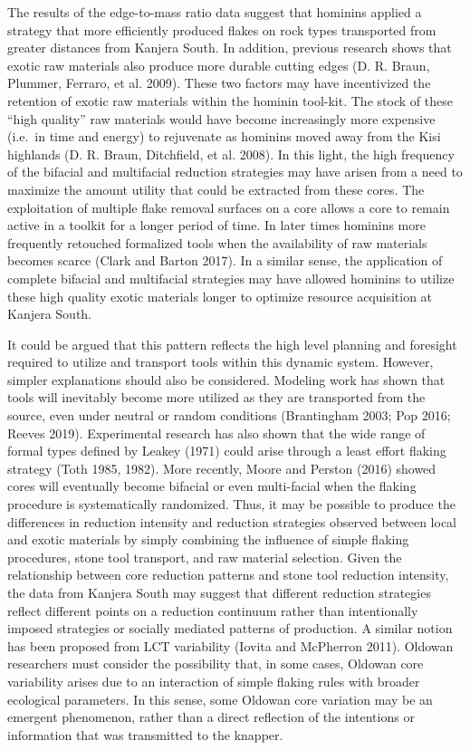 \documentclass[]{elsarticle} %
\begin{document}
The results of the edge-to-mass ratio data suggest that hominins applied
a strategy that more efficiently produced flakes on rock types
transported from greater distances from Kanjera South. In addition,
previous research shows that exotic raw materials also produce more
durable cutting edges (D. R. Braun, Plummer, Ferraro, et al. 2009).
These two factors may have incentivized the retention of exotic raw
materials within the hominin tool-kit. The stock of these ``high
quality'' raw materials would have become increasingly more expensive
(i.e.~in time and energy) to rejuvenate as hominins moved away from the
Kisi highlands (D. R. Braun, Ditchfield, et al. 2008). In this light,
the high frequency of the bifacial and multifacial reduction strategies
may have arisen from a need to maximize the amount utility that could be
extracted from these cores. The exploitation of multiple flake removal
surfaces on a core allows a core to remain active in a toolkit for a
longer period of time. In later times hominins more frequently retouched
formalized tools when the availability of raw materials becomes scarce
(Clark and Barton 2017). In a similar sense, the application of complete
bifacial and multifacial strategies may have allowed hominins to utilize
these high quality exotic materials longer to optimize resource
acquisition at Kanjera South.

It could be argued that this pattern reflects the high level planning
and foresight required to utilize and transport tools within this
dynamic system. However, simpler explanations should also be considered.
Modeling work has shown that tools will inevitably become more utilized
as they are transported from the source, even under neutral or random
conditions (Brantingham 2003; Pop 2016; Reeves 2019). Experimental
research has also shown that the wide range of formal types defined by
Leakey (1971) could arise through a least effort flaking strategy (Toth
1985, 1982). More recently, Moore and Perston (2016) showed cores will
eventually become bifacial or even multi-facial when the flaking
procedure is systematically randomized. Thus, it may be possible to
produce the differences in reduction intensity and reduction strategies
observed between local and exotic materials by simply combining the
influence of simple flaking procedures, stone tool transport, and raw
material selection. Given the relationship between core reduction
patterns and stone tool reduction intensity, the data from Kanjera South
may suggest that different reduction strategies reflect different points
on a reduction continuum rather than intentionally imposed strategies or
socially mediated patterns of production. A similar notion has been
proposed from LCT variability (Iovita and McPherron 2011). Oldowan
researchers must consider the possibility that, in some cases, Oldowan
core variability arises due to an interaction of simple flaking rules
with broader ecological parameters. In this sense, some Oldowan core
variation may be an emergent phenomenon, rather than a direct reflection
of the intentions or information that was transmitted to the knapper.
\end{document}
